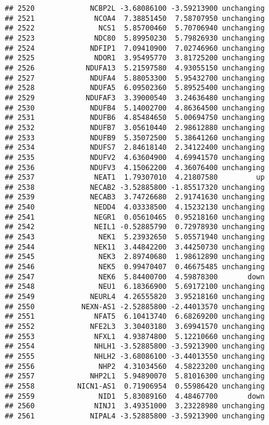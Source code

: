 \documentclass[]{article}
\begin{document}
\begin{verbatim}
## 2520             NCBP2L -3.68086100 -3.59213900 unchanging
## 2521              NCOA4  7.38851450  7.58707950 unchanging
## 2522               NCS1  5.85700460  5.70706940 unchanging
## 2523              NDC80  5.89950230  5.79826930 unchanging
## 2524             NDFIP1  7.09410900  7.02746960 unchanging
## 2525              NDOR1  3.95495770  3.81725200 unchanging
## 2526            NDUFA13  5.21597580  4.93055150 unchanging
## 2527             NDUFA4  5.88053300  5.95432700 unchanging
## 2528             NDUFA5  6.09502360  5.89525400 unchanging
## 2529            NDUFAF3  3.39000540  3.24636480 unchanging
## 2530             NDUFB4  5.14002700  4.86364500 unchanging
## 2531             NDUFB6  4.85484650  5.00694750 unchanging
## 2532             NDUFB7  3.05610440  2.98612880 unchanging
## 2533             NDUFB9  5.35072500  5.38641260 unchanging
## 2534             NDUFS7  2.84618140  2.34122400 unchanging
## 2535             NDUFV2  4.63604900  4.69941570 unchanging
## 2536             NDUFV3  4.15062200  4.36076400 unchanging
## 2537              NEAT1  1.79307010  4.21807580         up
## 2538             NECAB2 -3.52885800 -1.85517320 unchanging
## 2539             NECAB3  3.74726680  2.91741630 unchanging
## 2540              NEDD4  4.03338500  4.15232130 unchanging
## 2541              NEGR1  0.05610465  0.95218160 unchanging
## 2542              NEIL1 -0.52885790  0.72978930 unchanging
## 2543               NEK1  5.23932650  5.05571940 unchanging
## 2544              NEK11  3.44842200  3.44250730 unchanging
## 2545               NEK3  2.89740680  1.98612890 unchanging
## 2546               NEK5  0.99470407  0.46675485 unchanging
## 2547               NEK6  5.84400700  4.59878300       down
## 2548               NEU1  6.18366900  5.69172100 unchanging
## 2549             NEURL4  4.26555820  3.95218160 unchanging
## 2550           NEXN-AS1 -2.52885800 -2.44013570 unchanging
## 2551              NFAT5  6.10413740  6.68269200 unchanging
## 2552             NFE2L3  3.30403180  3.69941570 unchanging
## 2553              NFXL1  4.93874800  5.12210660 unchanging
## 2554              NHLH1 -3.52885800 -3.59213900 unchanging
## 2555              NHLH2 -3.68086100 -3.44013550 unchanging
## 2556               NHP2  4.31034560  4.58223200 unchanging
## 2557             NHP2L1  5.94890070  5.81016300 unchanging
## 2558          NICN1-AS1  0.71906954  0.55986420 unchanging
## 2559               NID1  5.83089160  4.48467700       down
## 2560              NINJ1  3.49351000  3.23228980 unchanging
## 2561             NIPAL4 -3.52885800 -3.59213900 unchanging

\end{verbatim}
\end{document}
